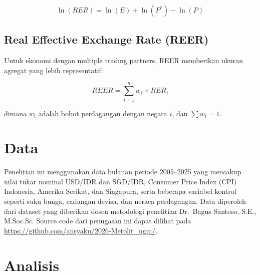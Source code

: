 \documentclass[12pt]{article}
\begin{document}
\begin{equation}
    \ln(RER) = \ln(E) + \ln(P^*) - \ln(P)
\end{equation}

\subsection{Real Effective Exchange Rate (REER)}

Untuk ekonomi dengan multiple trading partners, REER memberikan ukuran agregat yang lebih representatif:

\begin{equation}
    REER = \sum_{i=1}^{n} w_i \times RER_i
\end{equation}

dimana $w_i$ adalah bobot perdagangan dengan negara $i$, dan $\sum w_i = 1$.



\section{Data}

Penelitian ini menggunakan data bulanan periode 2005--2025 yang mencakup
nilai tukar nominal USD/IDR dan SGD/IDR, Consumer Price Index (CPI)
Indonesia, Amerika Serikat, dan Singapura, serta beberapa variabel kontrol
seperti suku bunga, cadangan devisa, dan neraca perdagangan.
Data diperoleh dari dataset yang diberikan dosen metodologi penelitian 
Dr.\ Bagus Santoso, S.E., M.Soc.Sc. Source code dari penugasan ini 
dapat dilihat pada \url{https://github.com/ansyaku/2026-Metolit_ugm/}.
\section{Analisis}
\end{document}
